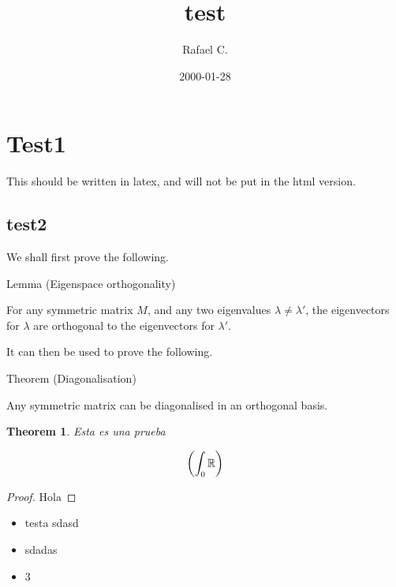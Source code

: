 \documentclass{article}
\title{test}
\author{Rafael C.}
\date{2000-01-28}
\newtheorem{theorem}{Theorem}[section]
\begin{document}
\maketitle

\tableofcontents


\section{Test1}


This should be written in latex, and will not be put in the html version.

\subsection{test2}


We shall first prove the following.

Lemma (Eigenspace orthogonality)

For any symmetric matrix $M$, and any two eigenvalues $\lambda \ne \lambda'$, the eigenvectors for $\lambda$ are orthogonal to the eigenvectors for $\lambda'$.


It can then be used to prove the following.

Theorem (Diagonalisation)

Any symmetric matrix can be diagonalised in an orthogonal basis.


\begin{theorem}
Esta es una prueba  

$$\qty(\int_0 \mathbb{R}) $$
\end{theorem}

\begin{proof}
Hola
\end{proof}

\begin{itemize}
\item testa sdasd
\item sdadas
\item 3
\end{itemize}
\end{document}
